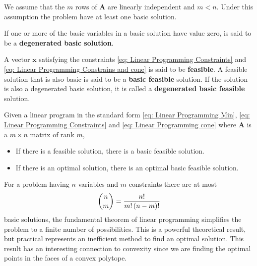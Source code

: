We assume that the $m$ rows of $\mathbf{A}$ are linearly independent and $m<n$. Under this assumption the problem have at least one basic solution.

\begin{definition}
If one or more of the basic variables in a basic solution have value zero, is said to be a \textbf{degenerated basic solution}.
\end{definition}

\begin{definition}
	A vector $\mathbf{x}$ satisfying the constraints \eqref{eq: Linear Programming Constraints} and \eqref{eq: Linear Programming Constrains and cone} is said to be \textbf{feasible}. A feasible solution that is also basic is said to be a \textbf{basic feasible} solution. If the solution is also a degenerated basic solution, it is called a \textbf{degenerated basic feasible} solution. 
\end{definition} 

\begin{theorem} Given a linear program in the standard form \eqref{eq: Linear Programming Min}, \eqref{eq: Linear Programming Constraints} and \eqref{eq: Linear Programming cone} where $\mathbf{A}$ is a $m\times n $ matrix of rank $m$,
	\begin{itemize}
		\item If there is a feasible solution, there is a basic feasible solution.
		\item If there is an optimal solution, there is an optimal basic feasible solution. 
	\end{itemize}
\end{theorem}
For a problem having $n$ variables and $m$ constraints there are at most
\begin{equation*}
	\binom{n}{m}=\frac{n!}{m!\left( n-m \right)!}
\end{equation*}
basic solutions, the fundamental theorem of linear programming simplifies the problem to a finite number of possibilities. This is a  powerful theoretical result, but practical represents an inefficient method to find an optimal solution. This result has an interesting connection to convexity since we are finding the optimal points in the faces of a convex polytope.


